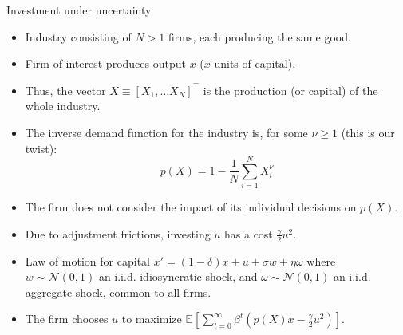 \documentclass[aspectratio=169,10pt]{beamer}
\newcommand{\expec}[2][]{\ensuremath{\mathbb{E}_{{#1}}\left[ {#2} \right]}}
\begin{document}
	\begin{frame}{Investment under uncertainty}
		
		\begin{itemize}
			
			\item Industry consisting of $N > 1$ firms, each producing the same good.\vspace{0.1in}
			
			\item Firm of interest  produces output $x$ ($x$ units of capital).\vspace{0.1in}
			
			\item Thus, the vector $X \equiv [X_1, \ldots X_N]^\top$ is the production (or capital) of the whole industry.\vspace{0.1in}
			
			\item The inverse demand function for the industry is, for some $\nu \geq 1$ (this is our twist):
			\begin{equation*}
				p(X) = 1 - \frac{1}{N}\sum_{i=1}^N X_i^{\nu}
			\end{equation*}
			
			\item The firm does not consider the impact of its individual decisions on $p(X)$. \vspace{0.1in}
			
			\item Due to adjustment frictions, investing $u$ has a cost $\frac{\gamma}{2}u^2$.\vspace{0.1in}
			
			\item Law of motion for capital $x' = (1-\delta)x + u + \sigma w + \eta \omega$ where $w \sim \mathcal{N}(0,1)$ an i.i.d. idiosyncratic shock,  and $\omega \sim \mathcal{N}(0,1)$ an i.i.d. aggregate shock, common to all firms.\vspace{0.1in}
			
			\item The firm chooses $u$ to maximize $\expec{\sum_{t=0}^{\infty} \beta^t \left(p(X)x-\frac{\gamma}{2}u^2\right)}$.\vspace{0.1in}
			
		\end{itemize}
		
	\end{frame}
	
\end{document}
